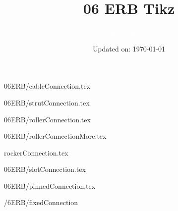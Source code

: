 \documentclass[9pt, xcolor={svgnames, x11names},professionalfonts]{beamer}
\title[ERB Tikz]{\Huge 06 ERB Tikz}
\subtitle[Engineering Statics]{\Large\textcolor{white}{Engineering Statics}}
\author{}
\date{\small Updated on: \today}
\def\scale{1}
\begin{document}

\begin{frame}[plain]    %
	\titlepage
\end{frame}



\begin{frame}{06ERB/cableConnection.tex}
	\def\scale{0.5}
	
\end{frame}

\begin{frame}{06ERB/strutConnection.tex}
	\def\scale{0.5}
	
\end{frame}

\begin{frame}{06ERB/rollerConnection.tex}
	\def\scale{0.45}
	
\end{frame}

\begin{frame}{06ERB/rollerConnectionMore.tex}
	\def\scale{0.35}	
	
\end{frame}

\begin{frame}{rockerConnection.tex}
	\def\scale{0.35}
	
\end{frame}

\begin{frame}{06ERB/slotConnection.tex}
	\def\scale{0.45}
		
\end{frame}

\begin{frame}{06ERB/pinnedConnection.tex}
	\def\scale{0.45}
		
\end{frame}

\begin{frame}{/6ERB/fixedConnection}
	\def\scale{0.45}
		
\end{frame}
\end{document}
